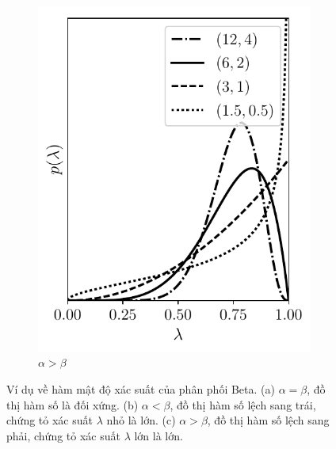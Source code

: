 \begin{figure}[t]
\begin{subfigure}{0.325\textwidth}
\includegraphics[width=0.99\linewidth]{Chapters/02_LinearAlgebra/30_prob/python/beta3.pdf}
\caption{$\alpha > \beta$}
\label{fig:30_3c}
\end{subfigure}
\caption{
Ví dụ về hàm mật độ xác suất của phân phối Beta. (a) $\alpha = \beta$, đồ thị
hàm số là đối xứng. (b) $\alpha < \beta$, đồ thị hàm số lệch sang trái, chứng tỏ xác suất $\lambda$ nhỏ là lớn. (c) $\alpha > \beta$, đồ thị hàm số lệch sang phải, chứng tỏ xác suất $\lambda$ lớn là lớn.
}
\label{fig:30_3}
\end{figure}

